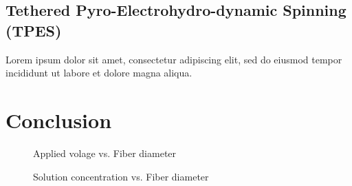 \documentclass[5p,,preprint,12pt,twocolumn]{elsarticle}
\makeatletter
\def\fixFloatSize#1{}%
\makeatother
\begin{document}
\subsection{Tethered Pyro-Electrohydro-dynamic Spinning (TPES) \unskip~\protect\cite{527120:11974307}}Lorem ipsum dolor sit amet, consectetur adipiscing elit, sed do eiusmod tempor incididunt ut labore et dolore magna aliqua. 
    
\section{Conclusion}

\bgroup
\fixFloatSize{images/e4441f91-c9b9-48f1-a3ed-5ec3e5033092-uplt_diametervolage.png}
\begin{figure}[!htbp]
\centering \makeatletter{}
\makeatother 
\caption{{Applied volage vs. Fiber diameter}}
\label{f-59ed68f95344}
\end{figure}
\egroup

\bgroup
\fixFloatSize{images/6198525c-7b44-494e-a092-206ecb3c8f9c-uweightdiameterplot.png}
\begin{figure}[!htbp]
\centering \makeatletter{}
\makeatother 
\caption{{Solution concentration vs. Fiber diameter}}
\label{f-0ba4df766d66}
\end{figure}
\egroup
\end{document}

